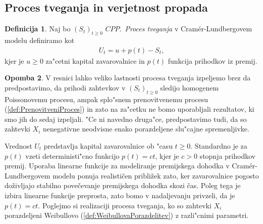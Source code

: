\documentclass[12pt, a4paper, reqno]{amsart}
\theoremstyle{definition}
\newtheorem{definicija}{Definicija}[section]
\newtheorem{opomba}[definicija]{Opomba}
\theoremstyle{plain}
\newcommand{\1}{\mathds{1}}
\begin{document}
    \subsection{Proces tveganja in verjetnost propada}

        \begin{definicija}
            Naj bo $(S_t)_{t\geq0 }$ $CPP$.\ \textit{Proces tveganja} v Cramér-Lundbergovem modelu definiramo kot
            \begin{align*}
                U_t = u + p(t) - S_t,
            \end{align*}
            kjer je $u \geq 0$ za"cetni kapital zavarovalnice in $p(t)$ funkcija prihodkov iz premij. 
            \label{def:procesTveganja}
        \end{definicija}

        \begin{opomba}
            V resnici lahko veliko lastnosti procesa tveganja izpeljemo brez da predpostavimo, da prihodi 
            zahtevkov v $(S_t)_{t\geq0}$ sledijo homogenem Poissonovemu procesu,
            ampak splo"snem prenovitvenemu procesu (\ref{def:PrenovitveniProces}) in
            zato na za"cetku ne bomo uporabljali rezultatov, ki smo jih do sedaj izpeljali. "Ce ni navedno 
            druga"ce, predpostavimo tudi, da so zahtevki $X_i$ nenegativne neodvisne enako porazdeljene
            slu"cajne spremenljivke.
            \label{op:procesTveganja}
        \end{opomba}

        Vrednost $U_t$ predstavlja kapital zavarovalnice ob "casu $t\geq0$. Standardno je za $p(t)$ 
        vzeti deterministi"cno funkcijo $p(t) = ct$, kjer je $c>0$ stopnja prihodkov premij.
        Uporaba linearne funkcije za modeliranje premijskega dohodka v Cramér-Lundbergovem 
        modelu ponuja realističen približek zato, ker zavarovalnice pogosto doživljajo 
        stabilno povečevanje premijskega dohodka skozi čas. Poleg tega je izbira linearne 
        funkcije preprosta, zato bomo v nadaljevanju privzeli, da je $p(t) = ct$. Poglejmo si 
        realizaciji procesa tveganja, ko so zahtevki $X_i$ porazdeljeni Weibullovo 
        (\ref{def:WeibullovaPorazdelitev}) z razli"cnimi parametri. 
\end{document}
